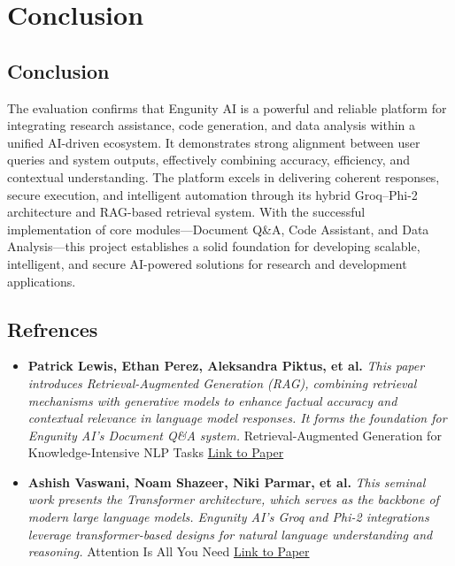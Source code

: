 \chapter{Conclusion}
\section{Conclusion}


The evaluation confirms that Engunity AI is a powerful and reliable platform for integrating research assistance, code generation, and data analysis within a unified AI-driven ecosystem. It demonstrates strong alignment between user queries and system outputs, effectively combining accuracy, efficiency, and contextual understanding. The platform excels in delivering coherent responses, secure execution, and intelligent automation through its hybrid Groq–Phi-2 architecture and RAG-based retrieval system. With the successful implementation of core modules—Document Q&A, Code Assistant, and Data Analysis—this project establishes a solid foundation for developing scalable, intelligent, and secure AI-powered solutions for research and development applications.
\pagebreak

\section{Refrences}

\begin{itemize}
    \item \textbf{Patrick Lewis, Ethan Perez, Aleksandra Piktus, et al.} \textit{This paper introduces Retrieval-Augmented Generation (RAG), combining retrieval mechanisms with generative models to enhance factual accuracy and contextual relevance in language model responses. It forms the foundation for Engunity AI’s Document Q\&A system.}  
    Retrieval-Augmented Generation for Knowledge-Intensive NLP Tasks  
    \href{https://arxiv.org/pdf/2005.11401}{Link to Paper}

    \item \textbf{Ashish Vaswani, Noam Shazeer, Niki Parmar, et al.} \textit{This seminal work presents the Transformer architecture, which serves as the backbone of modern large language models. Engunity AI’s Groq and Phi-2 integrations leverage transformer-based designs for natural language understanding and reasoning.}  
    Attention Is All You Need  
    \href{https://arxiv.org/pdf/1706.03762}{Link to Paper}
\end{itemize}

